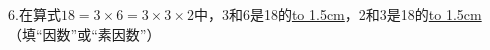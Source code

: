 \question 6.在算式$18 = 3\times6 = 3\times3\times2$中，3和6是18的\underline{\hbox to 1.5cm{}}，2和3是18的\underline{\hbox to 1.5cm{}}（填“因数”或“素因数”）